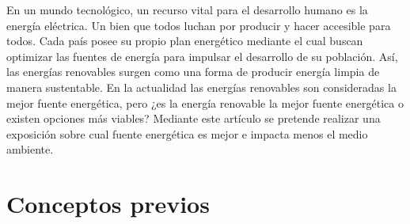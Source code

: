 \documentclass[12pt,spanish,Letterpaper,openany]{book}
\newcommand{\spacefivemilis}{\vspace{5mm}}
\newcommand{\spaceminusmilis}{\vspace{-0.5mm}}
\begin{document}
En un mundo tecnológico, un recurso vital para el desarrollo humano es la energía eléctrica. Un bien que todos luchan por producir y hacer accesible para todos. Cada país posee su propio plan energético mediante el cual buscan optimizar las fuentes de energía para impulsar el desarrollo de su población. Así, las energías renovables surgen como una forma de producir energía limpia de manera sustentable. En la actualidad las energías renovables son consideradas la mejor fuente energética, pero ¿es la energía renovable la mejor fuente energética o existen opciones más viables? Mediante este artículo se pretende realizar una exposición sobre cual fuente energética es mejor e impacta menos el medio ambiente.

\spacefivemilis

\hypertarget{conceptos-previos}{%
\section{Conceptos previos}\label{conceptos-previos}}

\spaceminusmilis
\end{document}
